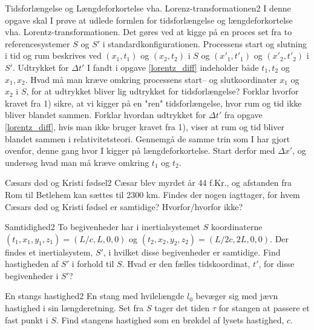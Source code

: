 \begin{opgave}{Tidsforlængelse og Længdeforkortelse vha. Lorenz-transformationen}{2}
	I denne opgave skal I prøve at udlede formlen for tidsforlængelse og længdeforkortelse vha. Lorentz-transformationen. Det gøres ved at kigge på en proces set fra to referencesystemer $S$ og $S'$ i standardkonfigurationen. Processens start og slutning i tid og rum beskrives ved $(x_1,t_1)$ og $(x_2,t_2)$ i $S$ og $(x'_1,t'_1)$ og $(x'_2,t'_2)$ i $S'$.
	\opg Udtrykket for $\Delta t'$ I fandt i opgave \ref{lorentz_diff} indeholder både $t_1,t_2$ og $x_1,x_2$. Hvad må man kræve omkring processens start-- og slutkoordinater $x_1$ og $x_2$ i $S$, for at udtrykket bliver lig udtrykket for tidsforlængelse?
	\opg Forklar hvorfor kravet fra 1) sikre, at vi kigger på en "ren" tidsforlængelse, hvor rum og tid ikke bliver blandet sammen.
	\opg Forklar hvordan udtrykket for $\Delta t'$ fra opgave \ref{lorentz_diff}, hvis man ikke bruger kravet fra 1), viser at rum og tid bliver blandet sammen i relativitetsteori.
	\opg Gennemgå de samme trin som I har gjort ovenfor, denne gang hvor I kigger på længdeforkortelse. Start derfor med $\Delta x'$, og undersøg hvad man må kræve omkring $t_1$ og $t_2$.
\end{opgave}

\begin{opgave}{Cæsars død og Kristi fødsel}{2}
	Cæsar blev myrdet år 44 f.Kr., og afstanden fra Rom til Betlehem kan sættes til 2300 km.
	\opg Findes der nogen iagttager, for hvem Cæsars død og Kristi fødsel er samtidige? Hvorfor/hvorfor ikke?
\end{opgave}

\begin{opgave}{Samtidighed}{2}
	To begivenheder har i inertialsystemet $S$ koordinaterne $(t_1,x_1,y_1,z_1)=(L/c,L,0,0)$ og $(t_2,x_2,y_2,z_2)=(L/2c,2L,0,0)$.
	\opg Der findes et inertialsystem, $S'$, i hvilket disse begivenheder er samtidige. Find hastigheden af $S'$ i forhold til $S$.
	\opg Hvad er den fælles tidskoordinat, $t'$, for disse begivenheder i $S'$?
\end{opgave}

\begin{opgave}{En stangs hastighed}{2}
	En stang med hvilelængde $l_0$ bevæger sig med jævn hastighed i sin længderetning. Set fra $S$ tager det tiden $\tau$ for stangen at passere et fast punkt i $S$. 
	\opg Find stangens hastighed som en brøkdel af lysets hastighed, $c$.
\end{opgave}


